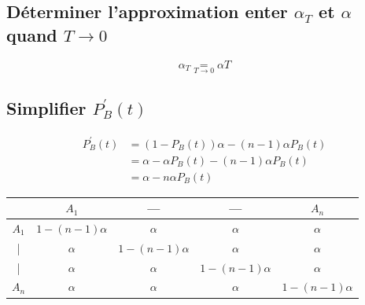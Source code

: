 \documentclass[11pt,a4paper]{article}
\begin{document}
	\subsection{Déterminer l'approximation enter $\alpha_{T}$ et $\alpha$ quand $T \to 0$}
	$$\alpha_{T} \underset{T \to 0}{=} \alpha T$$
	
	\subsection{Simplifier $P_{B}^{\prime}(t)$}
	\begin{align*}
		P_{B}^{\prime}(t) &= (1 - P_{B}(t))\alpha - (n - 1)\alpha P_{B}(t)\\
		&= \alpha - \alpha P_{B}(t) - (n - 1)\alpha P_{B}(t)\\
		&= \alpha - n\alpha P_{B}(t)
	\end{align*}
	
	\begin{center}
		\begin{tabular}{|c|c|c|c|c|}
			\hline 
			& $A_{1}$ & --- & --- & $A_{n}$ \\ 
			\hline 
			$A_{1}$ & $1 - (n - 1)\alpha$ & $\alpha$ & $\alpha$ & $\alpha$ \\ 
			\hline 
			| & $\alpha$ & $1 - (n - 1)\alpha$ & $\alpha$ & $\alpha$ \\ 
			\hline 
			| & $\alpha$ & $\alpha$ & $1 - (n - 1)\alpha$ & $\alpha$ \\ 
			\hline 
			$A_{n}$ & $\alpha$ & $\alpha$ & $\alpha$ & $1 - (n - 1)\alpha$ \\ 
			\hline 
		\end{tabular} 
	\end{center}
\end{document}
